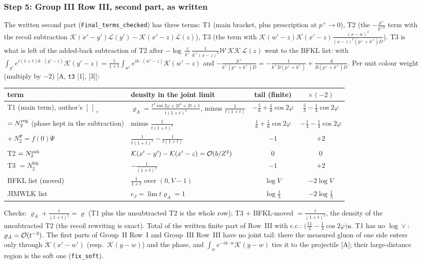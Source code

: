 \documentclass[10pt]{article}
\begin{document}
\subsubsection{Step 5: Group III Row III, second part, as written}
\noindent The written second part (\texttt{Final\_terms\_checked}) has three terms: T1 (main bracket, plus prescription at $p^{+}\to0$), T2 (the $-\frac{p^{+}}{k^{+2}}$ term with the recoil subtraction $\mathcal{K}(x'-y')\mathcal{L}(y')-\mathcal{K}(x'-z)\mathcal{L}(z)$), T3 (the term with $\mathcal{K}(w'-z)\mathcal{K}(x'-z)\frac{(x-w)^{2}}{(x-z)^{2}(p^{+}+k^{+})D}$). T3 is what is left of the added-back subtraction of T2 after $-\log\frac{\vee}{k^{+}}\frac{1}{k^{+}(x-z)^{2}}\mathcal{W}\,\mathcal{K}\mathcal{K}\,\mathcal{L}(z)$ went to the BFKL list: with $\int_{y'}e^{i(1+t)k\cdot(y'-z)}\mathcal{K}(y'-z)=\frac{1}{1+t}\int_{w'}e^{ik\cdot(w'-z)}\mathcal{K}(w'-z)$ and $-\frac{p^{+}}{k^{+}(p^{+}+k^{+})D}=-\frac{1}{k^{+}B(p^{+}+k^{+})}+\frac{A}{B(p^{+}+k^{+})D}$. Per unit colour weight (multiply by $-2$) [A, \texttt{t3} [1], [3]]:
\begin{center}
\renewcommand{\arraystretch}{1.35}
\begin{tabular}{|l|l|c|c|}\hline
term & density in the joint limit & tail (finite) & $\times(-2)$\\\hline
T1 (main term), author's $[\,]_{+}$ & $\varrho_{A}=\frac{t^{2}\cos2\varphi+2t^{2}+2t+1}{t(1+t)^{4}}$, minus $\frac{1}{t(1+t)}$ & $-\frac56+\frac16\cos2\varphi$ & $\frac53-\frac13\cos2\varphi$\\
\quad $=N_{2}^{\rm reg}$ (phase kept in the subtraction) & minus $\frac{1}{t(1+t)^{2}}$ & $\frac16+\frac16\cos2\varphi$ & $-\frac13-\frac13\cos2\varphi$\\
\quad $+\,N_{2}^{\Psi}=f(0)\Psi$ & $\frac{1}{t(1+t)^{2}}-\frac{1}{t(1+t)}$ & $-1$ & $+2$\\
T2 $=N_{2}^{\rm sub}$ & $\mathcal{K}(x'-y')-\mathcal{K}(x'-z)={\cal O}(b/Z^{2})$ & $0$ & $0$\\
T3 $=N_{2}^{\log}$ & $-\frac{1}{(1+t)^{2}}$ & $-1$ & $+2$\\\hline
BFKL list (moved) & $\frac{1}{1+t}$ over $(0,V-1)$ & $\log V$ & $-2\log V$\\
JIMWLK list & $c_{J}=\lim t\varrho_{A}=1$ & $\log\frac1\lambda$ & $-2\log\frac1\lambda$\\\hline
\end{tabular}
\end{center}
Checks: $\varrho_{A}+\frac{t}{(1+t)^{2}}=\varrho$ (T1 plus the unsubtracted T2 is the whole row); T3 $+$ BFKL-moved $=\frac{t}{(1+t)^{2}}$, the density of the unsubtracted T2 (the recoil rewriting is exact). Total of the written finite part of Row~III with c.c.: $\big(\frac{11}{3}-\frac13\cos2\varphi\big)\mathsf{u}$. T1 has no $\log\vee$: $\varrho_{A}={\cal O}(t^{-3})$. The first parts of Group~II Row~I and Group~III Row~III have no joint tail: there the measured gluon of one side enters only through $\mathcal{K}(x'-w')$ (resp.\ $\mathcal{K}(y-w)$) and the phase, and $\int_{w}e^{-ik\cdot w}\mathcal{K}(y-w)$ ties it to the projectile [A]; their large-distance region is the soft one (\texttt{fix\_soft}).
\end{document}
